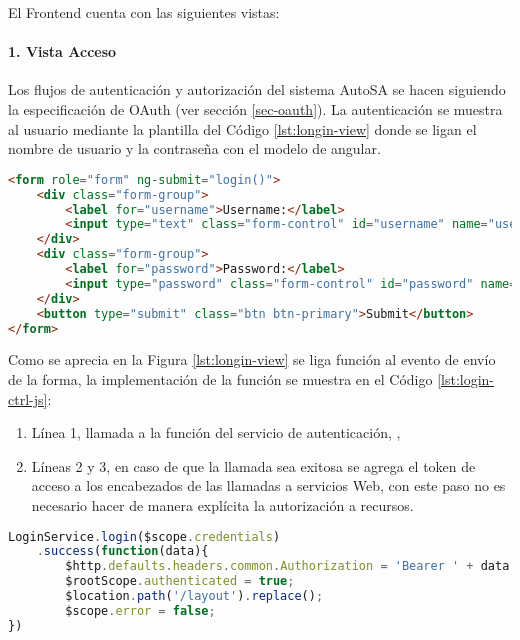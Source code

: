 El Frontend cuenta con las siguientes vistas:

\paragraph{1. Vista Acceso\\}
Los flujos de autenticación y autorización del sistema AutoSA se hacen siguiendo la especificación de OAuth (ver sección \ref{sec-oauth}). La autenticación se muestra al usuario mediante la plantilla del Código \ref{lst:longin-view} donde se ligan el nombre de usuario y la contraseña con el modelo de angular.

\begin{lstlisting}[language=HTML, caption={Plantilla HTML de acceso.}, captionpos=b, label={lst:longin-view}]
<form role="form" ng-submit="login()">
	<div class="form-group">
		<label for="username">Username:</label>
		<input type="text" class="form-control" id="username" name="username" ng-model="credentials.username"/>
	</div>
	<div class="form-group">
		<label for="password">Password:</label>
		<input type="password" class="form-control" id="password" name="password" ng-model="credentials.password"/>
	</div>
	<button type="submit" class="btn btn-primary">Submit</button>
</form>
\end{lstlisting}


Como se aprecia en la Figura \ref{lst:longin-view} se liga función  al evento de envío de la forma, la implementación de la función se muestra en el Código \ref{lst:login-ctrl-js}:
\begin{enumerate}
	\item Línea 1, llamada a la función  del servicio de autenticación, ,
	\item Líneas 2 y 3, en caso de que la llamada sea exitosa se agrega el token de acceso a los encabezados de las llamadas a servicios Web, con este paso no es necesario hacer de manera explícita la autorización a recursos.
\end{enumerate}

\begin{lstlisting}[language=Javascript, caption={Uso del servicio que optine un token de acceso.}, captionpos=b, label={lst:login-ctrl-js}]
LoginService.login($scope.credentials)
	.success(function(data){
		$http.defaults.headers.common.Authorization = 'Bearer ' + data.access_token;
		$rootScope.authenticated = true;
		$location.path('/layout').replace();
		$scope.error = false;
})
\end{lstlisting}

